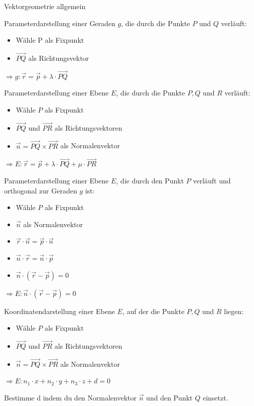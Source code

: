 \begin{example2}{Vektorgeometrie allgemein}

    Parameterdarstellung einer Geraden $g$, die durch die Punkte $P$ und $Q$ verläuft:
    \begin{itemize}
        \item Wähle P als Fixpunkt
        \item $\vec{P Q}$ als Richtungsvektor
    \end{itemize}
    $\Rightarrow g: \vec{r}=\vec{p}+ \lambda \cdot \vec{PQ}$

    \vspace*{3mm}

    Parameterdarstellung einer Ebene $E$, die durch die Punkte $P, Q$ und $R$ verläuft:
    \begin{itemize}
        \item Wähle $P$ als Fixpunkt
        \item $\vec{PQ}$ und $\vec{PR}$ als Richtungsvektoren
        \item $\vec{n}=\vec{PQ} \times \vec{PR}$ als Normalenvektor
    \end{itemize}
    $\Rightarrow E: \vec{r}=\vec{p}+ \lambda \cdot \vec{PQ} + \mu \cdot \vec{PR}$

    \vspace*{3mm}

    Parameterdarstellung einer Ebene $E$, die durch den Punkt $P$ verläuft und orthogonal zur Geraden $g$ ist:
    \begin{itemize}
        \item Wähle $P$ als Fixpunkt
        \item $\vec{n}$ als Normalenvektor
        \item $\vec{r} \cdot \vec{n} = \vec{p} \cdot \vec{n}$
        \item $\vec{n} \cdot \vec{r} = \vec{n} \cdot \vec{p}$
        \item $\vec{n} \cdot (\vec{r} - \vec{p}) = 0$
    \end{itemize}
    $\Rightarrow E: \vec{n} \cdot (\vec{r} - \vec{p}) = 0$

    \vspace{3mm}

    Koordinatendarstellung einer Ebene $E$, auf der die Punkte $P, Q$ und $R$ liegen:
    \begin{itemize}
        \item Wähle $P$ als Fixpunkt
        \item $\vec{PQ}$ und $\vec{PR}$ als Richtungsvektoren
        \item $\vec{n}=\vec{PQ} \times \vec{PR}$ als Normalenvektor
    \end{itemize}
    $\Rightarrow E: n_1 \cdot x + n_2 \cdot y + n_3 \cdot z + d = 0$
    
    Bestimme d indem du den Normalenvektor $\vec{n}$ und den Punkt $Q$ einsetzt.

    \vspace{3mm}
\end{example2}


